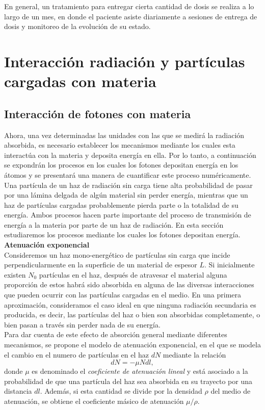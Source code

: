 En general, un tratamiento para entregar cierta cantidad de dosis se realiza a lo largo de un mes, en donde el paciente asiste diariamente a sesiones de entrega de dosis y monitoreo de la evolución de su estado. \\    

\section{Interacción radiación y partículas cargadas con materia}
\subsection{Interacción de fotones con materia}
Ahora, una vez determinadas las unidades con las que se medirá la radiación absorbida, es necesario establecer los mecanismos mediante los cuales esta interactúa con la materia y deposita energía en ella. Por lo tanto, a continuación se expondrán los procesos en los cuales los fotones depositan energía en los átomos y se presentará una manera de cuantificar este proceso numéricamente.  \\

Una partícula de un haz de radiación sin carga tiene alta probabilidad de pasar por una lámina delgada de algún material sin perder energía, mientras que un haz de partículas cargadas probablemente pierda parte o la totalidad de su energía. Ambos procesos hacen parte importante del proceso de transmisión de energía a la materia por parte de un haz de radiación. En esta sección estudiaremos los procesos mediante los cuales los fotones depositan energía.\\

\noindent
\textbf{Atenuación exponencial}\\


Consideremos un haz mono-energético de partículas sin carga que incide perpendicularmente en la superficie de un material de espesor $L$. Si inicialmente existen $N_0$ partículas en el haz, después de atravesar el material alguna proporción de estos habrá sido absorbida en alguna de las diversas interacciones que pueden ocurrir con las partículas cargadas en el medio. En una primera aproximación, consideramos el caso ideal en que ninguna radiación secundaria es producida, es decir, las partículas del haz o bien son absorbidas completamente, o bien pasan a través sin perder nada de su energía.\\

Para dar cuenta de este efecto de absorción general mediante diferentes mecanismos, se propone el modelo de atenuación exponencial, en el que se modela el cambio en el numero de partículas en el haz $dN$ mediante la relación
\begin{equation}
	dN=-\mu N dl,
\end{equation}  
donde $\mu$ es denominado el \textit{coeficiente de atenuación lineal} y está asociado a la probabilidad de que una partícula del haz sea absorbida en su trayecto por una distancia $dl$. Además, si esta cantidad se divide por la densidad $\rho$ del medio de atenuación, se obtiene el coeficiente másico de atenuación $\mu/\rho$.\\

